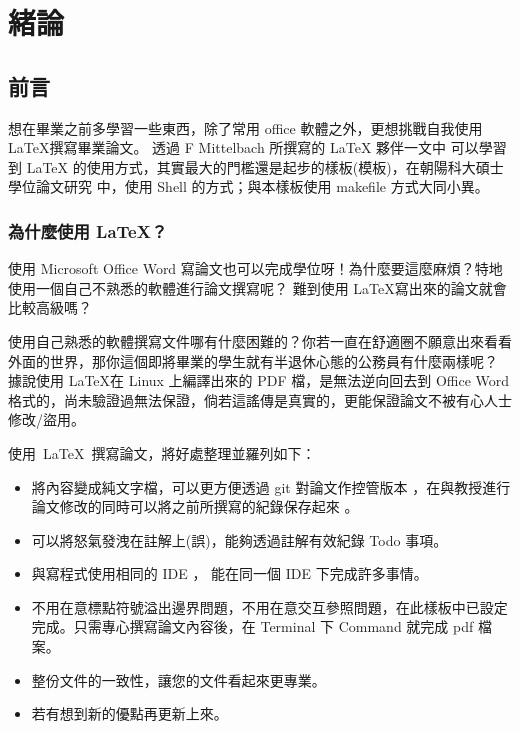 \chapter{緒論}\label{explanation}


\section{前言}\label{1-1}
想在畢業之前多學習一些東西，除了常用 office 軟體之外，更想挑戰自我使用 \LaTeX 撰寫畢業論文\cite{learn-latex}。
透過 F Mittelbach 所撰寫的 LaTeX 夥伴一文中 \cite{mittelbach2004} 可以學習到 LaTeX\cite{the-latex-project} 的使用方式，其實最大的門檻還是起步的樣板(模板)，在朝陽科大碩士學位論文研究 \cite{ShellLATEX} 中，使用 Shell 的方式；與本樣板使用 makefile 方式大同小異。

\subsection{為什麼使用 LaTeX？}
使用 Microsoft Office Word 寫論文也可以完成學位呀！為什麼要這麼麻煩？特地使用一個自己不熟悉的軟體進行論文撰寫呢？
難到使用 \LaTeX 寫出來的論文就會比較高級嗎？

使用自己熟悉的軟體撰寫文件哪有什麼困難的？你若一直在舒適圈不願意出來看看外面的世界，那你這個即將畢業的學生就有半退休心態的公務員有什麼兩樣呢？
據說使用 \LaTeX 在 Linux 上編譯出來的 PDF 檔，是無法逆向回去到 Office Word 格式的，尚未驗證過無法保證，倘若這謠傳是真實的，更能保證論文不被有心人士修改/盜用。

\clearpage

\hbox{使用 LaTeX 撰寫論文，將好處整理並羅列如下：}

\begin{itemize}
\item 將內容變成純文字檔，可以更方便透過 git \cite{git-version-control} \cite{git20190914} 對論文作控管版本 \cite{spinellis2012git}，在與教授進行論文修改的同時可以將之前所撰寫的紀錄保存起來 \cite{chacon2014pro}。
\item 可以將怒氣發洩在註解上(誤)，能夠透過註解有效紀錄 Todo 事項。
\item 與寫程式使用相同的 IDE ， 能在同一個 IDE 下完成許多事情。
\item 不用在意標點符號溢出邊界問題，不用在意交互參照問題，在此樣板中已設定完成。只需專心撰寫論文內容後，在 Terminal 下 Command 就完成 pdf 檔案。
\item 整份文件的一致性，讓您的文件看起來更專業。
\item 若有想到新的優點再更新上來。
\end{itemize}

